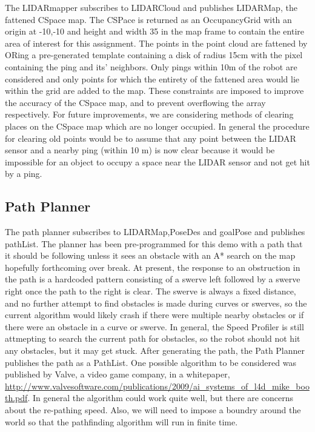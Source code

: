 \documentclass{article}
\begin{document}
The LIDARmapper subscribes to LIDARCloud and publishes LIDARMap, the fattened CSpace map.
The CSPace is returned as an OccupancyGrid with an origin at -10,-10 and height and width 35 in the map frame to contain the entire area of interest for this assignment.
The points in the point cloud are fattened by ORing a pre-generated template containing a disk of radius 15cm with the pixel containing the ping and its' neighbors.
Only pings within 10m of the robot are considered and only points for which the entirety of the fattened area would lie within the grid are added to the map.
These constraints are imposed to improve the accuracy of the CSpace map, and to prevent overflowing the array respectively.
For future improvements, we are considering methods of clearing places on the CSpace map which are no longer occupied.
In general the procedure for clearing old points would be to assume that any point between the LIDAR sensor and a nearby ping (within 10 m) is now clear because it would be impossible for an object to occupy a space near the LIDAR sensor and not get hit by a ping.



\subsection{Path Planner}

The path planner subscribes to LIDARMap,PoseDes and goalPose and publishes pathList.
The planner has been pre-programmed for this demo with a path that it should be following unless it sees an obstacle with an A* search on the map hopefully forthcoming over break.
At present, the response to an obstruction in the path is a hardcoded pattern consisting of a swerve left followed by a swerve right once the path to the right is clear.
The swerve is always a fixed distance, and no further attempt to find obstacles is made during curves or swerves, so the current algorithm would likely crash if there were multiple nearby obstacles or if there were an obstacle in a curve or swerve.
In general, the Speed Profiler is still attmepting to search the current path for obstacles, so the robot should not hit any obstacles, but it may get stuck.
After generating the path, the Path Planner publishes the path as a PathList.
One possible algorithm to be considered was published by Valve, a video game company, in a whitepaper, \url{http://www.valvesoftware.com/publications/2009/ai_systems_of_l4d_mike_booth.pdf}.
In general the algorithm could work quite well, but there are concerns about the re-pathing speed.
Also, we will need to impose a boundry around the world so that the pathfinding algorithm will run in finite time.
\end{document}
